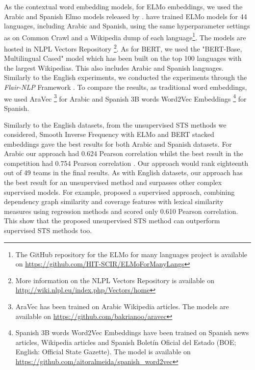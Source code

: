 As the contextual word embedding models, for ELMo embeddings, we used the Arabic and Spanish Elmo models released by \textcite{che-EtAl:2018:K18-2}. \textcite{che-EtAl:2018:K18-2} have trained ELMo models for 44 languages, including Arabic and Spanish, using the same hyperparameter settings as \textcite{peters-etal-2018-deep} on Common Crawl and a Wikipedia dump of each language\footnote{The GitHub repository for the ELMo for many languages project is available on \url{https://github.com/HIT-SCIR/ELMoForManyLangs}}. The models are hosted in NLPL Vectors Repository \autocite{fares-etal-2017-word}\footnote{More information on the NLPL Vectors Repository is available on \url{http://wiki.nlpl.eu/index.php/Vectors/home}}. As for BERT, we used the "BERT-Base, Multilingual Cased" model \autocite{devlin-etal-2019-bert} which has been built on the top 100 languages with the largest Wikipedias. This also includes Arabic and Spanish languages. Similarly to the English experiments, we conducted the experiments through the \textit{Flair-NLP} Framework \autocite{akbik-etal-2019-flair}. To compare the results, as traditional word embeddings,  we used AraVec \autocite{SOLIMAN2017256} \footnote{AraVec has been trained on Arabic Wikipedia articles. The models are available on \url{https://github.com/bakrianoo/aravec}} for Arabic and Spanish 3B words Word2Vec Embeddings \autocite{doi:10.1177/1550147718811827}\footnote{Spanish 3B words Word2Vec Embeddings have been trained on Spanish news articles, Wikipedia articles and Spanish Boletín Oficial del Estado (BOE; English: Official State Gazette). The model is available on \url{https://github.com/aitoralmeida/spanish_word2vec}} for Spanish.

Similarly to the English datasets, from the unsupervised STS methods we considered, Smooth Inverse Frequency with ELMo and BERT stacked embeddings gave the best results for both Arabic and Spanish datasets. For Arabic our approach had 0.624 Pearson correlation whilst the best result \autocite{wu-etal-2017-bit} in the competition had 0.754 Pearson correlation \autocite{cer-etal-2017-semeval}. Our approach would rank eighteenth out of 49 teams in the final results. As with English datasets, our approach has the best result for an unsupervised method and surpasses other complex supervised models. For example, \textcite{kohail-etal-2017-sts} proposed a supervised approach, combining dependency graph similarity and coverage features with lexical similarity measures using regression methods and scored only 0.610 Pearson correlation. This show that the proposed unsupervised STS method can outperform supervised STS methods too.



